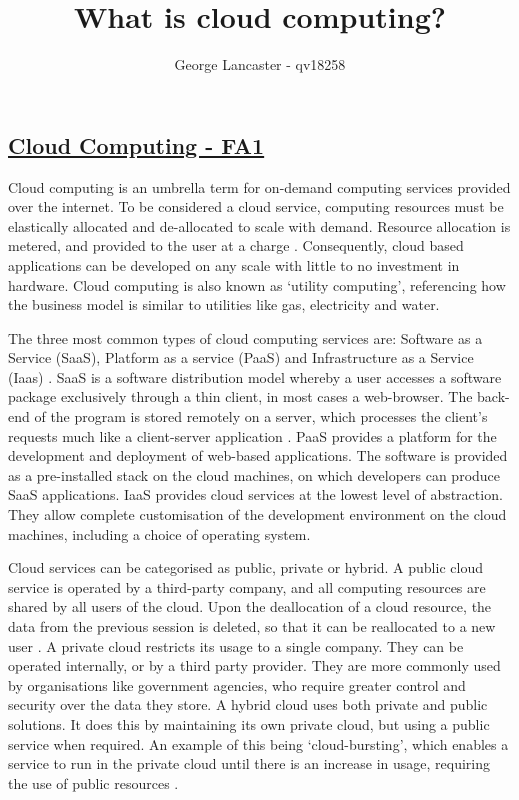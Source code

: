 \documentclass[]{report}
\title{What is cloud computing?}
\author{George Lancaster - qv18258}
\begin{document}
\begin{centering}
\section*{\underline{  Cloud Computing - FA1  }}
\end{centering}

Cloud computing is an umbrella term for on-demand computing services provided over the internet. To be considered a cloud service, computing resources must be elastically allocated and de-allocated to scale with demand. Resource allocation is metered, and provided to the user at a charge \cite{mell2011nist}. Consequently, cloud based applications can be developed on any scale with little to no investment in hardware. Cloud computing is also known as `utility computing', referencing how the business model is similar to utilities like gas, electricity and water. 
\par
The three most common types of cloud computing services are: Software as a Service (SaaS), Platform as a service (PaaS) and Infrastructure as a Service (Iaas) \cite{cliff2010remotely}. SaaS is a software distribution model whereby a user accesses a software package exclusively through a thin client, in most cases a web-browser. The back-end of the program is stored remotely on a server, which processes the client's requests much like a client-server application \cite{turner2003turning}. PaaS provides a platform for the development and deployment of web-based applications. The software is provided as a pre-installed stack on the cloud machines, on which developers can produce SaaS applications. IaaS provides cloud services at the lowest level of abstraction. They allow complete customisation of the development environment on the cloud machines, including a choice of operating system.
\par
Cloud services can be categorised as public, private or hybrid. A public cloud service is operated by a third-party company, and all computing resources are shared by all users of the cloud. Upon the deallocation of a cloud resource, the data from the previous session is deleted, so that it can be reallocated to a new user \cite{ren2012security}. A private cloud restricts its usage to a single company. They can be operated internally, or by a third party provider. They are more commonly used by organisations like government agencies, who require greater control and security over the data they store. A hybrid cloud uses both private and public solutions. It does this by maintaining its own private cloud, but using a public service when required. An example of this being `cloud-bursting', which enables a service to run in the private cloud until there is an increase in usage, requiring the use of public resources \cite{guo2014cost} \cite{WinNT}. 
\end{document}
